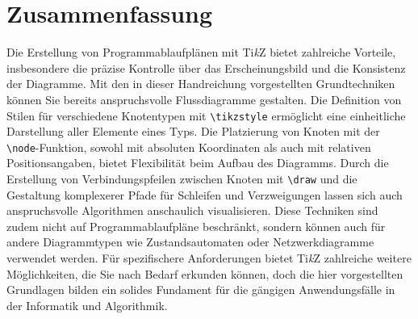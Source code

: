 \begin{ausgabe}
\begin{center}\end{center}
\end{ausgabe}


\section{Zusammenfassung}

Die Erstellung von Programmablaufplänen mit Ti\textit{k}Z bietet zahlreiche Vorteile, insbesondere die präzise Kontrolle über das Erscheinungsbild und die Konsistenz der Diagramme. Mit den in dieser Handreichung vorgestellten Grundtechniken können Sie bereits anspruchsvolle Flussdiagramme gestalten. Die Definition von Stilen für verschiedene Knotentypen mit \texttt{\textbackslash tikzstyle} ermöglicht eine einheitliche Darstellung aller Elemente eines Typs. Die Platzierung von Knoten mit der \texttt{\textbackslash node}-Funktion, sowohl mit absoluten Koordinaten als auch mit relativen Positionsangaben, bietet Flexibilität beim Aufbau des Diagramms. Durch die Erstellung von Verbindungspfeilen zwischen Knoten mit \texttt{\textbackslash draw} und die Gestaltung komplexerer Pfade für Schleifen und Verzweigungen lassen sich auch anspruchsvolle Algorithmen anschaulich visualisieren. Diese Techniken sind zudem nicht auf Programmablaufpläne beschränkt, sondern können auch für andere Diagrammtypen wie Zustandsautomaten oder Netzwerkdiagramme verwendet werden. Für spezifischere Anforderungen bietet Ti\textit{k}Z zahlreiche weitere Möglichkeiten, die Sie nach Bedarf erkunden können, doch die hier vorgestellten Grundlagen bilden ein solides Fundament für die gängigen Anwendungsfälle in der Informatik und Algorithmik.


